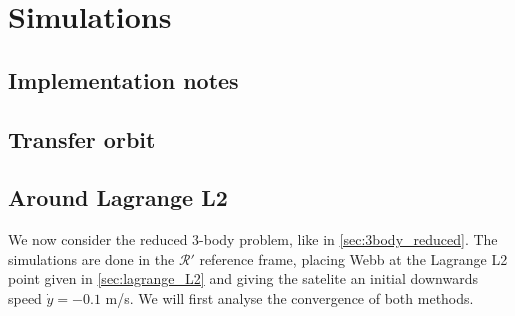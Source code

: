 \section{Simulations}

\subsection{Implementation notes}

\subsection{Transfer orbit}

\subsection{Around Lagrange L2}

We now consider the reduced 3-body problem, like in \ref{sec:3body_reduced}. The simulations are done in the \(\mathcal R'\) reference frame, placing Webb at the Lagrange L2 point given in \ref{sec:lagrange_L2} and giving the satelite an initial downwards speed \(\dot y = -0.1\) m/s. We will first analyse the convergence of both methods.


